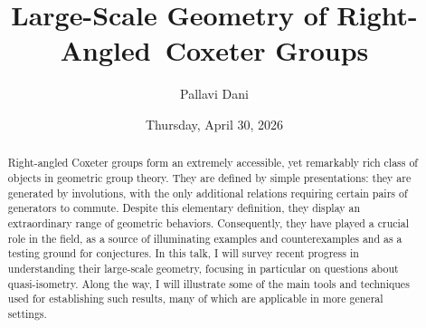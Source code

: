 \documentclass{UAmathtalk}
\author{Pallavi Dani}
\title{Large-Scale Geometry of Right-Angled~Coxeter Groups}
\date{Thursday, April 30, 2026}
\begin{document}
\maketitle

\begin{abstract}
Right-angled Coxeter groups form an extremely accessible, yet remarkably rich class of objects in geometric group theory. They are defined by simple presentations: they are generated by involutions, with the only additional relations requiring certain pairs of generators to commute. Despite this elementary definition, they display an extraordinary range of geometric behaviors. Consequently, they have played a crucial role in the field, as a source of illuminating examples and counterexamples and as a testing ground for conjectures. In this talk, I will survey recent progress in understanding their large-scale geometry, focusing in particular on questions about quasi-isometry. Along the way, I will illustrate some of the main tools and techniques used for establishing such results, many of which are applicable in more general settings.
\end{abstract}
\end{document}
